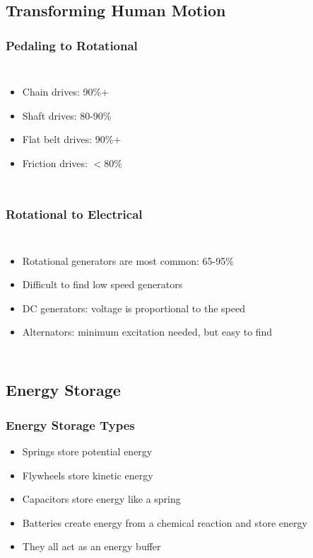 \documentclass[]{beamer}
\begin{document}
\subsection{Transforming Human Motion}
\frame
{
  \frametitle{Pedaling to Rotational}
  \begin{columns}[t]
    \column{6cm}
    \begin{itemize}
      \item<1->\alert<1>{Chain drives: 90\%+}
      \item<1->\alert<2>{Shaft drives: 80-90\%}
      \item<1->\alert<3>{Flat belt drives: 90\%+}
      \item<1->\alert<4>{Friction drives: $<$80\%}
    \end{itemize}
    \column{5cm}
  \end{columns}
}
\frame
{
  \frametitle{Rotational to Electrical}
  \begin{columns}[t]
    \column{6cm}
    \begin{itemize}[<+->]
      \item Rotational generators are most common: 65-95\%
      \item Difficult to find low speed generators
      \item DC generators: voltage is proportional to the speed
      \item Alternators: minimum excitation needed, but easy to find
    \end{itemize}
    \column{5cm}
  \end{columns}
}
\subsection{Energy Storage}
\frame
{
  \frametitle{Energy Storage Types}
  \begin{itemize}[<+->]
    \item Springs store potential energy 
    \item Flywheels store kinetic energy 
    \item Capacitors store energy like a spring 
    \item Batteries create energy from a chemical reaction and store energy
    \item They all act as an energy buffer
  \end{itemize}
}
\end{document}
